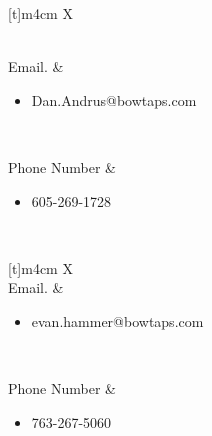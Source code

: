 \begin{center}
\begin{tabularx}{\textwidth}[t]{m{4cm} X}

\hline
{} \\
\hline
Email.  &
\begin{minipage}[t]{\linewidth}%
\begin{itemize}
\item Dan.Andrus@bowtaps.com\\

\end{itemize} 
\end{minipage}\\

\hline

Phone Number &
\begin{minipage}[t]{\linewidth}%
\begin{itemize}
\item 605-269-1728
\end{itemize} 
\end{minipage}\\




\end{tabularx}
\end{center}

\begin{center}
\begin{tabularx}{\textwidth}[t]{m{4cm} X}
\hline
{} \\
\hline
Email.  &
\begin{minipage}[t]{\linewidth}%
\begin{itemize}
\item evan.hammer@bowtaps.com\\

\end{itemize} 
\end{minipage}\\

\hline

Phone Number &
\begin{minipage}[t]{\linewidth}%
\begin{itemize}
\item 763-267-5060
\end{itemize} 
\end{minipage}\\



\end{tabularx}
\end{center}

